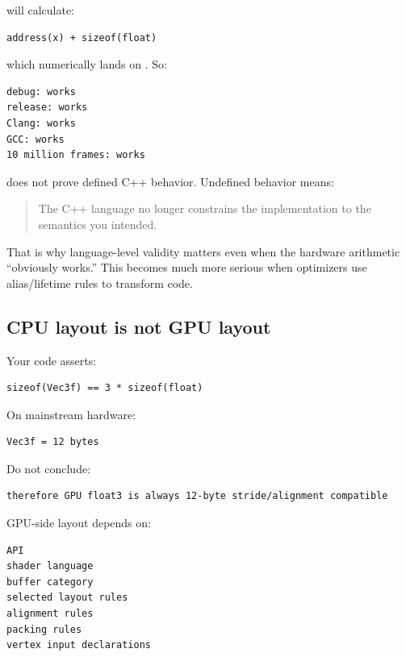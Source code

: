 will calculate:

\begin{verbatim}
address(x) + sizeof(float)
\end{verbatim}

which numerically lands on . So:

\begin{verbatim}
debug: works
release: works
Clang: works
GCC: works
10 million frames: works
\end{verbatim}

does not prove defined C++ behavior. Undefined behavior means:

\begin{quote}
The C++ language no longer constrains the implementation to the semantics you intended.
\end{quote}

That is why language-level validity matters even when the hardware arithmetic ``obviously works.'' This becomes much more serious when optimizers use alias/lifetime rules to transform code.

\subsection{CPU layout is not GPU layout}\label{01-foundations-i-ch003-cpu-layout-is-not-gpu-layout}

\hypertarget{01-foundations-i-ch003-cpu-layout-is-not-gpu-layout}{}

Your code asserts:

\begin{verbatim}
sizeof(Vec3f) == 3 * sizeof(float)
\end{verbatim}

On mainstream hardware:

\begin{verbatim}
Vec3f = 12 bytes
\end{verbatim}

Do not conclude:

\begin{verbatim}
therefore GPU float3 is always 12-byte stride/alignment compatible
\end{verbatim}

GPU-side layout depends on:

\begin{verbatim}
API
shader language
buffer category
selected layout rules
alignment rules
packing rules
vertex input declarations
\end{verbatim}

